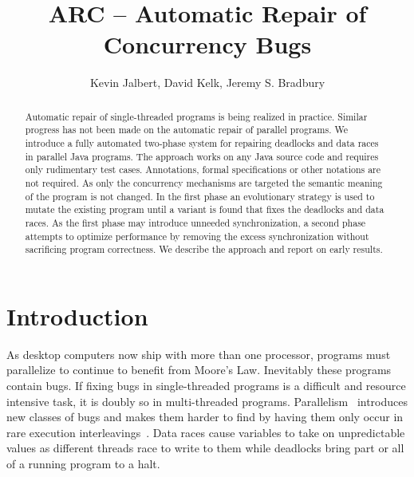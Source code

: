 \documentclass{llncs}
\begin{document}
\title{ARC -- Automatic Repair of Concurrency Bugs}

\author{Kevin Jalbert, David Kelk, Jeremy S. Bradbury}


\maketitle

\begin{abstract}

Automatic repair of single-threaded programs is being realized in practice.
Similar progress has not been made on the automatic repair of parallel
programs. We introduce a fully automated two-phase system for repairing
deadlocks and data races in parallel Java programs. The approach works on any
Java source code and requires only rudimentary test cases. Annotations, formal
specifications or other notations are not required. As only the concurrency
mechanisms are targeted the semantic meaning of the program is not changed. In
the first phase an evolutionary strategy is used to mutate the existing program
until a variant is found that fixes the deadlocks and data races. As the first
phase may introduce unneeded synchronization, a second phase attempts to
optimize performance by removing the excess synchronization without sacrificing
program correctness. We describe the approach and report on early results.

\end{abstract}

\section{Introduction}
\label{sec:introduction}

As desktop computers now ship with more than one processor, programs must
parallelize to continue to benefit from Moore's Law. Inevitably these programs
contain bugs. If fixing bugs in single-threaded programs is a difficult and
resource intensive task,  it is doubly so in multi-threaded programs.
Parallelism~\cite{SL05} introduces new classes of bugs and makes them harder to
find by having them only occur in rare execution interleavings~\cite{MQB07}.
Data races cause variables to take on unpredictable values as different threads
race to write to them while deadlocks bring part or all of a running program to
a halt.
\end{document}
